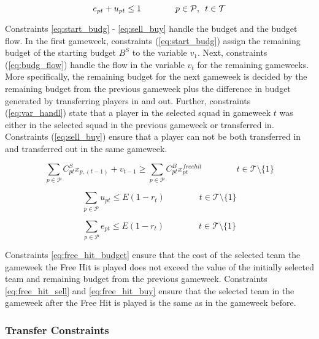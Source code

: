 \begin{equation} \label{eq:sell_buy}
   e_{pt} + u_{pt} \leq 1  \qquad\qquad p \in \mathcal{P}, \enskip t \in \mathcal{T} 
\end{equation}

Constraints \eqref{eq:start_budg} - \eqref{eq:sell_buy} handle the budget and the budget flow. In the first gameweek, constraints (\ref{eq:start_budg}) assign the remaining budget of the starting budget $B^{S}$ to the variable $v_{1}$. Next, constraints (\ref{eq:budg_flow}) handle the flow in the variable $v_{t}$ for the remaining gameweeks. More specifically, the remaining budget for the next gameweek is decided by the remaining budget from the previous gameweek plus the difference in budget generated by transferring players in and out. Further, constraints (\ref{eq:var_handl}) state that a player in the selected squad in gameweek $t$ was either in the selected squad in the previous gameweek or transferred in. Constraints (\ref{eq:sell_buy}) ensure that a player can not be both transferred in and transferred out in the same gameweek.


\begin{equation} \label{eq:free_hit_budget}
  \sum_{p \in \mathcal{P}}C_{pt}^{S}x_{p,(t-1)} + v_{t-1} \geq \sum_{p \in \mathcal{P}}C_{pt}^{B} x_{pt}^{free hit} \qquad\qquad t \in \mathcal{T}\setminus\{1\}
\end{equation}

\begin{equation} \label{eq:free_hit_sell}
  \sum_{p \in \mathcal{P}}u_{pt} \leq E (1-r_{t}) \qquad\qquad t \in \mathcal{T}\setminus\{1\}
\end{equation}

\begin{equation} \label{eq:free_hit_buy}
  \sum_{p \in \mathcal{P}}e_{pt} \leq E (1-r_{t}) \qquad\qquad t \in \mathcal{T}\setminus\{1\}
\end{equation}

Constraints \eqref{eq:free_hit_budget} ensure that the cost of the selected team the gameweek the Free Hit is played does not exceed the value of the initially selected team and remaining budget from the previous gameweek. Constraints \eqref{eq:free_hit_sell} and \eqref{eq:free_hit_buy} ensure that the selected team in the gameweek after the Free Hit is played is the same as in the gameweek before. 

\subsubsection{Transfer Constraints} \label{cons:trans}

